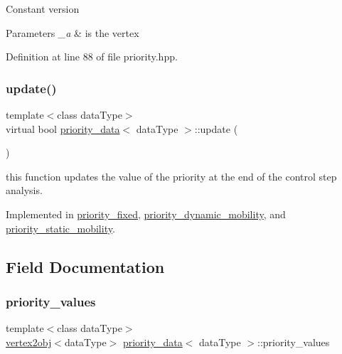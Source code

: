 Constant version 
\begin{DoxyParams}{Parameters}
{\em \+\_\+a} & is the vertex \\
\hline
\end{DoxyParams}


Definition at line 88 of file priority.\+hpp.

\mbox{\label{structpriority__data_a3cd70f3b6d8e300615ad91fd85291c76}} 
\subsubsection{\texorpdfstring{update()}{update()}}
{\footnotesize\ttfamily template$<$class data\+Type$>$ \\
virtual bool \hyperlink{structpriority__data}{priority\+\_\+data}$<$ data\+Type $>$\+::update (\begin{DoxyParamCaption}{ }\end{DoxyParamCaption})\hspace{0.3cm}{\ttfamily [pure virtual]}}



this function updates the value of the priority at the end of the control step analysis. 



Implemented in \hyperlink{structpriority__fixed_ad7f69dcb5974fda7d05af656dbaee1c7}{priority\+\_\+fixed}, \hyperlink{structpriority__dynamic__mobility_ab736af2d0bd541a8e53e37835900b061}{priority\+\_\+dynamic\+\_\+mobility}, and \hyperlink{structpriority__static__mobility_a2657d8916b4c48c72e158fc399eb298a}{priority\+\_\+static\+\_\+mobility}.



\subsection{Field Documentation}
\mbox{\label{structpriority__data_a47ac389dee4a6568964c9de2132122a2}} 
\subsubsection{\texorpdfstring{priority\+\_\+values}{priority\_values}}
{\footnotesize\ttfamily template$<$class data\+Type$>$ \\
\hyperlink{structvertex2obj}{vertex2obj}$<$data\+Type$>$ \hyperlink{structpriority__data}{priority\+\_\+data}$<$ data\+Type $>$\+::priority\+\_\+values\hspace{0.3cm}{\ttfamily [private]}}



